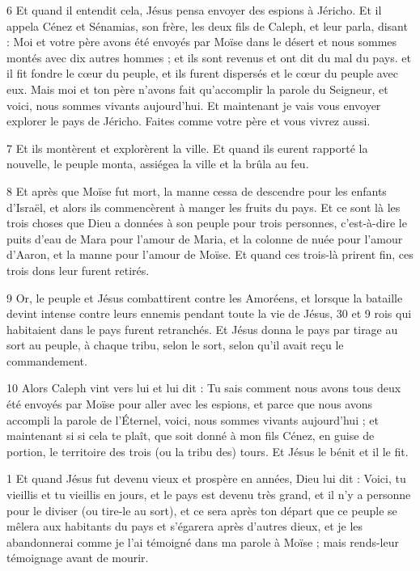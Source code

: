 \par 6 Et quand il entendit cela, Jésus pensa envoyer des espions à Jéricho. Et il appela Cénez et Sénamias, son frère, les deux fils de Caleph, et leur parla, disant : Moi et votre père avons été envoyés par Moïse dans le désert et nous sommes montés avec dix autres hommes ; et ils sont revenus et ont dit du mal du pays. et il fit fondre le cœur du peuple, et ils furent dispersés et le cœur du peuple avec eux. Mais moi et ton père n'avons fait qu'accomplir la parole du Seigneur, et voici, nous sommes vivants aujourd'hui. Et maintenant je vais vous envoyer explorer le pays de Jéricho. Faites comme votre père et vous vivrez aussi.

\par 7 Et ils montèrent et explorèrent la ville. Et quand ils eurent rapporté la nouvelle, le peuple monta, assiégea la ville et la brûla au feu.

\par 8 Et après que Moïse fut mort, la manne cessa de descendre pour les enfants d'Israël, et alors ils commencèrent à manger les fruits du pays. Et ce sont là les trois choses que Dieu a données à son peuple pour trois personnes, c'est-à-dire le puits d'eau de Mara pour l'amour de Maria, et la colonne de nuée pour l'amour d'Aaron, et la manne pour l'amour de Moïse. Et quand ces trois-là prirent fin, ces trois dons leur furent retirés.

\par 9 Or, le peuple et Jésus combattirent contre les Amoréens, et lorsque la bataille devint intense contre leurs ennemis pendant toute la vie de Jésus, 30 et 9 rois qui habitaient dans le pays furent retranchés. Et Jésus donna le pays par tirage au sort au peuple, à chaque tribu, selon le sort, selon qu'il avait reçu le commandement.

\par 10 Alors Caleph vint vers lui et lui dit : Tu sais comment nous avons tous deux été envoyés par Moïse pour aller avec les espions, et parce que nous avons accompli la parole de l'Éternel, voici, nous sommes vivants aujourd'hui ; et maintenant si si cela te plaît, que soit donné à mon fils Cénez, en guise de portion, le territoire des trois (ou la tribu des) tours. Et Jésus le bénit et il le fit.


\par 1 Et quand Jésus fut devenu vieux et prospère en années, Dieu lui dit : Voici, tu vieillis et tu vieillis en jours, et le pays est devenu très grand, et il n'y a personne pour le diviser (ou tire-le au sort), et ce sera après ton départ que ce peuple se mêlera aux habitants du pays et s'égarera après d'autres dieux, et je les abandonnerai comme je l'ai témoigné dans ma parole à Moïse ; mais rends-leur témoignage avant de mourir.

